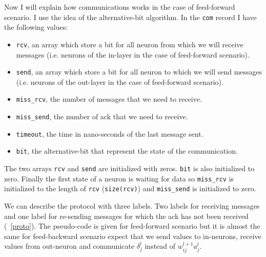 \documentclass[12pt]{article}
\begin{document}
Now I will explain how communications works in the case of feed-forward scenario. I use the idea of the alternative-bit algorithm. In the \verb|com| record I have the following values:
\begin{itemize}
	\item \verb|rcv|, an array which store a bit for all neuron from which we will receive messages (i.e. neurons of the in-layer in the case of feed-forward scenario).
	\item \verb|send|, an array which store a bit for all neuron to which we will send messages (i.e. neurons of the out-layer in the case of feed-forward scenario).
	\item \verb|miss_rcv|, the number of messages that we need to receive.
	\item \verb|miss_send|, the number of ack that we need to receive.
	\item \verb|timeout|, the time in nano-seconds of the last message sent.
	\item \verb|bit|, the alternative-bit that represent the state of the communication.
\end{itemize}
The two arrays \verb|rcv| and \verb|send| are initialized with zeros. \verb|bit| is also initialized to zero. Finally the first state of a neuron is waiting for data so \verb|miss_rcv| is initialized to the length of \verb|rcv| (\verb|size(rcv)|) and \verb|miss_send| is initialized to zero.

We can describe the protocol with three labels. Two labels for receiving messages and one label for re-sending messages for which the ack has not been received (\figurename~\ref{proto}). The pseudo-code is given for feed-forward scenario but it is almost the same for feed-backward scenario expect that we send values to in-neurons, receive values from out-neuron and communicate $\delta_j^l$ instead of $w_{ij}^{l+1} a_j^l$.

\newpage
\end{document}
